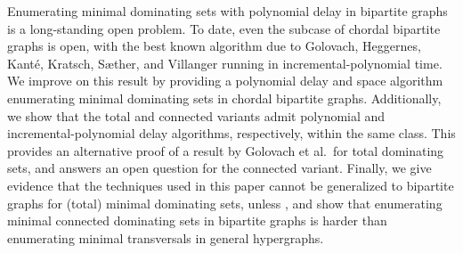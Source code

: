 Enumerating minimal dominating sets with polynomial delay in bipartite graphs is a long-standing open problem.
To date, even the subcase of chordal bipartite graphs is open, with the best known algorithm due to Golovach, Heggernes, Kanté, Kratsch, S\ae{}ther, and Villanger running in incremental-polynomial time.
We improve on this result by providing a polynomial delay and space algorithm enumerating minimal dominating sets in chordal bipartite graphs.
Additionally, we show that the total and connected variants admit polynomial and incremental-polynomial delay algorithms, respectively, within the same class.
This provides an alternative proof of a result by Golovach et al.~for total dominating sets, and answers an open question for the connected variant.
Finally, we give evidence that the techniques used in this paper cannot be generalized to bipartite graphs for (total) minimal dominating sets, unless \PNP{}, and show that enumerating minimal connected dominating sets in bipartite graphs is harder than enumerating minimal transversals in general hypergraphs.
